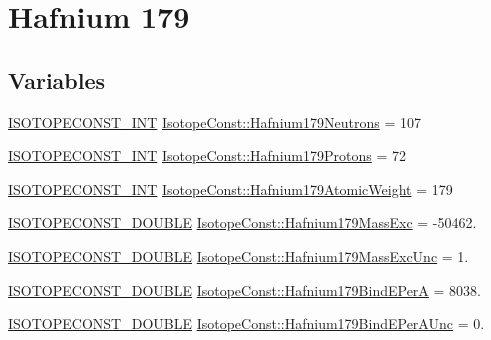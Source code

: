 \hypertarget{group___isotope_const-_hafnium-_hf179}{}\section{Hafnium 179}
\label{group___isotope_const-_hafnium-_hf179}
\subsection*{Variables}
\begin{DoxyCompactItemize}
\item 
\mbox{\hyperlink{group___isotope_const-_macros_ga5f18360b3e99483a35c32d789e62621c}{I\+S\+O\+T\+O\+P\+E\+C\+O\+N\+S\+T\+\_\+\+I\+NT}} \mbox{\hyperlink{group___isotope_const-_hafnium-_hf179_gad9f821b1c0c5eb784ea59813ded795fd}{Isotope\+Const\+::\+Hafnium179\+Neutrons}} = 107
\item 
\mbox{\hyperlink{group___isotope_const-_macros_ga5f18360b3e99483a35c32d789e62621c}{I\+S\+O\+T\+O\+P\+E\+C\+O\+N\+S\+T\+\_\+\+I\+NT}} \mbox{\hyperlink{group___isotope_const-_hafnium-_hf179_gababad464bb689660fa6e010227a62306}{Isotope\+Const\+::\+Hafnium179\+Protons}} = 72
\item 
\mbox{\hyperlink{group___isotope_const-_macros_ga5f18360b3e99483a35c32d789e62621c}{I\+S\+O\+T\+O\+P\+E\+C\+O\+N\+S\+T\+\_\+\+I\+NT}} \mbox{\hyperlink{group___isotope_const-_hafnium-_hf179_ga197a56aae65c02bbe302bf0724be341d}{Isotope\+Const\+::\+Hafnium179\+Atomic\+Weight}} = 179
\item 
\mbox{\hyperlink{group___isotope_const-_macros_ga8f45a7272ce02c0b4c65c44636ed719a}{I\+S\+O\+T\+O\+P\+E\+C\+O\+N\+S\+T\+\_\+\+D\+O\+U\+B\+LE}} \mbox{\hyperlink{group___isotope_const-_hafnium-_hf179_ga13dc94436e5c2fdb7afd121b27155ff3}{Isotope\+Const\+::\+Hafnium179\+Mass\+Exc}} = -\/50462.
\item 
\mbox{\hyperlink{group___isotope_const-_macros_ga8f45a7272ce02c0b4c65c44636ed719a}{I\+S\+O\+T\+O\+P\+E\+C\+O\+N\+S\+T\+\_\+\+D\+O\+U\+B\+LE}} \mbox{\hyperlink{group___isotope_const-_hafnium-_hf179_ga45060c3cc1359b4810145109ff519acd}{Isotope\+Const\+::\+Hafnium179\+Mass\+Exc\+Unc}} = 1.
\item 
\mbox{\hyperlink{group___isotope_const-_macros_ga8f45a7272ce02c0b4c65c44636ed719a}{I\+S\+O\+T\+O\+P\+E\+C\+O\+N\+S\+T\+\_\+\+D\+O\+U\+B\+LE}} \mbox{\hyperlink{group___isotope_const-_hafnium-_hf179_ga7ad665e5e849139772d1a5cb6730968f}{Isotope\+Const\+::\+Hafnium179\+Bind\+E\+PerA}} = 8038.
\item 
\mbox{\hyperlink{group___isotope_const-_macros_ga8f45a7272ce02c0b4c65c44636ed719a}{I\+S\+O\+T\+O\+P\+E\+C\+O\+N\+S\+T\+\_\+\+D\+O\+U\+B\+LE}} \mbox{\hyperlink{group___isotope_const-_hafnium-_hf179_ga7f4826d31554ab720796807ffe0480f8}{Isotope\+Const\+::\+Hafnium179\+Bind\+E\+Per\+A\+Unc}} = 0.

\end{DoxyCompactItemize}
